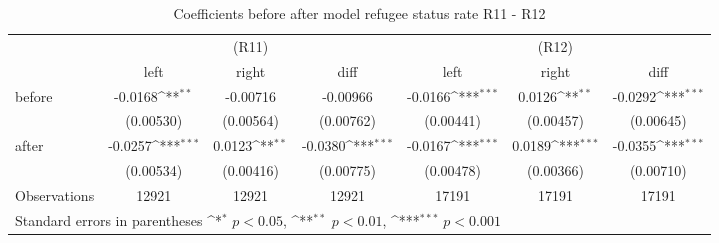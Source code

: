 \begin{table}[!ht]\centering \footnotesize
\def\sym#1{\ifmmode^{#1}\else\(^{#1}\)\fi}
\caption{Coefficients before after model refugee status rate R11 - R12}
\begin{tabular}{l*{6}{c}}
\hline\hline
                    &\multicolumn{3}{c}{(R11)}&\multicolumn{3}{c}{(R12)}\\
&\multicolumn{1}{c}{left}&\multicolumn{1}{c}{right}&\multicolumn{1}{c}{diff}&\multicolumn{1}{c}{left}&\multicolumn{1}{c}{right}&\multicolumn{1}{c}{diff}\\
\hline
before              &     -0.0168\sym{**} &    -0.00716         &    -0.00966         &     -0.0166\sym{***}&      0.0126\sym{**} &     -0.0292\sym{***}\\
                    &   (0.00530)         &   (0.00564)         &   (0.00762)         &   (0.00441)         &   (0.00457)         &   (0.00645)         \\
[0,5em]
after               &     -0.0257\sym{***}&      0.0123\sym{**} &     -0.0380\sym{***}&     -0.0167\sym{***}&      0.0189\sym{***}&     -0.0355\sym{***}\\
                    &   (0.00534)         &   (0.00416)         &   (0.00775)         &   (0.00478)         &   (0.00366)         &   (0.00710)         \\
\hline
Observations        &       12921         &       12921         &       12921         &       17191         &       17191         &       17191         \\
\hline\hline
\multicolumn{7}{l}{\footnotesize Standard errors in parentheses \sym{*} \(p<0.05\), \sym{**} \(p<0.01\), \sym{***} \(p<0.001\)}\\
\end{tabular}
\end{table}
